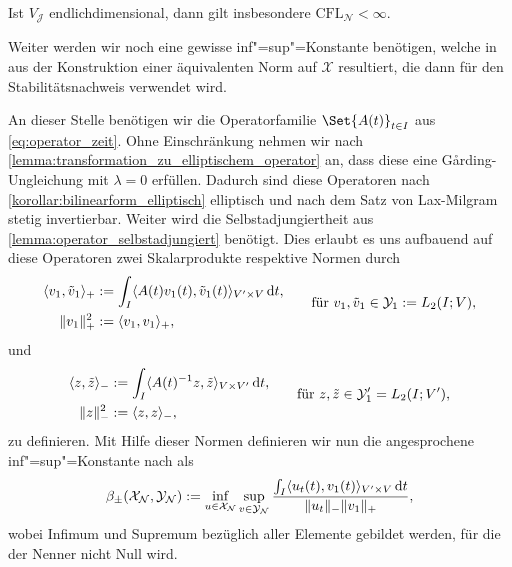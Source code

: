 \documentclass[../main.tex]{subfiles}
\begin{document}
\begin{Bemerkung}
    Ist $V_{\mathcal J}$ endlichdimensional, dann gilt insbesondere $\mathrm{CFL}_{\mathcal N} < \infty$.
\end{Bemerkung}

Weiter werden wir noch eine gewisse inf"=sup"=Konstante benötigen, welche in \cite[57]{Andreev:2012ep} aus der Konstruktion einer äquivalenten Norm auf $\mathcal X$ resultiert, die dann für den Stabilitätsnachweis \cite[Theorem 5.2.6]{Andreev:2012ep} verwendet wird.

An dieser Stelle benötigen wir die Operatorfamilie $\Set{A(t)}_{t \in I}$ aus \cref{eq:operator_zeit}.
Ohne Einschränkung nehmen wir nach \cref{lemma:transformation_zu_elliptischem_operator} an, dass diese eine G\aa{}rding-Ungleichung mit $\lambda = 0$ erfüllen.
Dadurch sind diese Operatoren nach \cref{korollar:bilinearform_elliptisch} elliptisch und nach dem Satz von Lax-Milgram \cite[Section 6.2.1]{evans2010partial} stetig invertierbar.
Weiter wird die Selbstadjungiertheit aus \cref{lemma:operator_selbstadjungiert} benötigt.
Dies erlaubt es uns aufbauend auf diese Operatoren zwei Skalarprodukte respektive Normen durch
\begin{equation}
    \begin{aligned}
        \langle v_{1},\tilde{v}_{1}\rangle_{+} &:= \int_{I} \langle A(t)v_{1}(t),\tilde{v}_{1}(t)\rangle_{V' \times V} \mathop{}\!\mathrm{d} t, \\
         \lVert v_{1}\rVert^{2}_{+} &:= \langle v_{1},v_{1}\rangle_{+},
    \end{aligned}
    \qquad \text{für } v_{1}, \tilde{v}_{1} \in \mathcal Y_{1} := L_{2}(I; V),
\end{equation}
und
\begin{equation}
    \begin{aligned}
        \langle z,\tilde{z}\rangle_{-} &:= \int_{I} \langle A(t)^{-1} z,\tilde z\rangle_{V \times V'} \mathop{}\!\mathrm{d} t, \\
        \lVert z\rVert_{-}^{2} &:= \langle z,z\rangle_{-},
    \end{aligned}
    \qquad \text{für } z, \tilde z \in \mathcal Y_{1}' = L_{2}(I; V'),
\end{equation}
zu definieren.
Mit Hilfe dieser Normen definieren wir nun die angesprochene inf"=sup"=Konstante nach \cite[57]{Andreev:2012ep} als
\begin{equation}
    \beta_{\pm}(\mathcal X_{\mathcal N}, \mathcal Y_{\mathcal N}) := \inf_{u \in \mathcal X_{\mathcal N}} \sup_{v \in \mathcal Y_{\mathcal N}} \frac{\int_{I} \langle u_t(t),v_{1}(t)\rangle_{V' \times V} \mathop{}\!\mathrm{d} t}{\lVert u_t\rVert_{-} \lVert v_{1}\rVert_{+}},
\end{equation}
wobei Infimum und Supremum bezüglich aller Elemente gebildet werden, für die der Nenner nicht Null wird.
\end{document}
